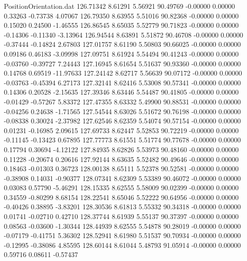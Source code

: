 \begin{filecontents}{PositionOrientation.dat}
 126.71342    8.61291    5.56921    90.49769   -0.00000    0.00000    0.33263   -0.73738    4.07067
 126.79350    8.63955    5.51016    90.82368   -0.00000    0.00000    0.15020    0.24500   -1.46555
 126.86545    8.65035    5.52779    90.71823   -0.00000    0.00000   -0.14306   -0.11340   -3.13964
 126.94544    8.63891    5.51872    90.46708   -0.00000    0.00000   -0.37444   -0.14824    2.67803
 127.01757    8.61190    5.50803    90.66025   -0.00000    0.00000    0.09186    0.46183   -3.09998
 127.09751    8.61924    5.54494    90.41243   -0.00000    0.00000   -0.03760   -0.39727    7.24443
 127.16945    8.61654    5.51637    90.93360   -0.00000    0.00000    0.14768    0.69519  -11.97633
 127.24142    8.62717    5.56639    90.07172   -0.00000    0.00000   -0.03763   -0.45394    6.27173
 127.32141    8.62416    5.53008    90.57341   -0.00000    0.00000    0.14306    0.20528   -2.15635
 127.39346    8.63446    5.54487    90.41805   -0.00000    0.00000   -0.01429   -0.57267    5.83372
 127.47355    8.63332    5.49900    90.88531   -0.00000    0.00000   -0.04256    0.24638   -1.71565
 127.54544    8.63026    5.51672    90.76198   -0.00000    0.00000   -0.08338    0.30024   -2.37982
 127.62546    8.62359    5.54074    90.57154   -0.00000    0.00000    0.01231   -0.16985    2.09615
 127.69733    8.62447    5.52853    90.72219   -0.00000    0.00000   -0.11145   -0.13423    0.67895
 127.77773    8.61551    5.51774    90.77678   -0.00000    0.00000    0.17794    0.30694   -4.12122
 127.84935    8.62826    5.53973    90.48160   -0.00000    0.00000    0.11228   -0.20674    0.20616
 127.92144    8.63635    5.52482    90.49646   -0.00000    0.00000    0.18463   -0.01303    0.36723
 128.00138    8.65111    5.52378    90.52581   -0.00000    0.00000   -0.38908    0.14031   -0.90377
 128.07341    8.62309    5.53389    90.46072   -0.00000    0.00000    0.03083    0.57790   -5.46291
 128.15335    8.62555    5.58009    90.02399   -0.00000    0.00000    0.34559   -0.80299    8.68154
 128.22541    8.65046    5.52222    90.64956   -0.00000    0.00000   -0.40426    0.38895   -3.83201
 128.30536    8.61813    5.55332    90.34318   -0.00000    0.00000    0.01741   -0.02710    0.42710
 128.37744    8.61939    5.55137    90.37397   -0.00000    0.00000    0.08563   -0.03600   -1.30344
 128.44939    8.62555    5.54878    90.28019   -0.00000    0.00000   -0.07179   -0.41751    5.36302
 128.52941    8.61980    5.51537    90.70934   -0.00000    0.00000   -0.12995   -0.38086    4.85595
 128.60144    8.61044    5.48793    91.05914   -0.00000    0.00000    0.59716    0.08611   -0.57437

\end{filecontents}

